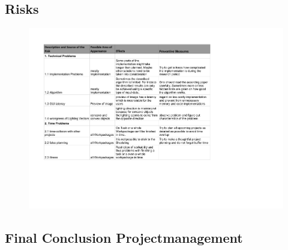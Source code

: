 \subsection{Risks} \label{sec:risks}
\begin{figure}[H] 
	\center 
	\includegraphics[scale = 0.7]{Images/risks.pdf}			
\end{figure}

\subsection{Final Conclusion Projectmanagement} \label{sec:pmCon}




\newpage

























